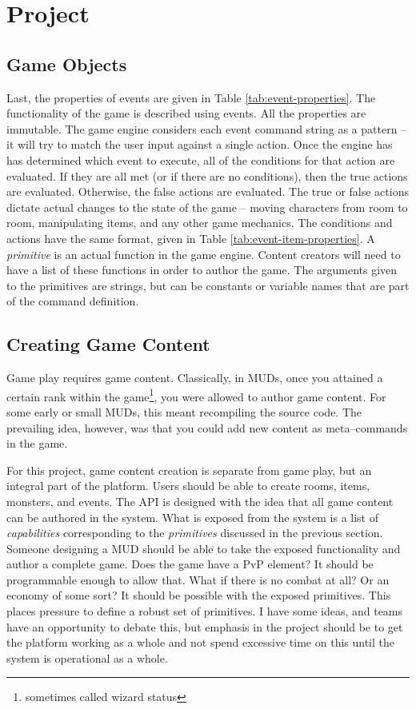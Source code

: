 \documentclass{article}
\newcommand{\enterProblemHeader}[1]{
}
\newcommand{\exitProblemHeader}[1]{
\nobreak\extramarks{#1}{}\nobreak
}
\newcounter{homeworkProblemCounter} %
\newcommand{\homeworkProblemName}{}
\newenvironment{homeworkProblem}[1][Problem \arabic{homeworkProblemCounter}]{ %
\stepcounter{homeworkProblemCounter} %
\renewcommand{\homeworkProblemName}{#1} %
\section{\homeworkProblemName} %
\enterProblemHeader{\homeworkProblemName} %
}{
\exitProblemHeader{\homeworkProblemName} %
}
\newcommand{\homeworkSectionName}{}
\newenvironment{homeworkSection}[1]{ %
\renewcommand{\homeworkSectionName}{#1} %
\subsection{\homeworkSectionName} %
\enterProblemHeader{\homeworkProblemName\ [\homeworkSectionName]} %
}{
\enterProblemHeader{\homeworkProblemName} %
}
\begin{document}
\begin{homeworkProblem}[Project]
\begin{homeworkSection}{Game Objects}
	Last, the properties of events are given in Table \ref{tab:event-properties}. The functionality of the game is described using events. All the properties are immutable. The game engine considers each event command string as a pattern -- it will try to match the user input against a single action. Once the engine has has determined which event to execute, all of the conditions for that action are evaluated. If they are all met (or if there are no conditions), then the true actions are evaluated. Otherwise, the false actions are evaluated. The true or false actions dictate actual changes to the state of the game -- moving characters from room to room, manipulating items, and any other game mechanics. The conditions and actions have the same format, given in Table \ref{tab:event-item-properties}. A \textit{primitive} is an actual function in the game engine. Content creators will need to have a list of these functions in order to author the game. The arguments given to the primitives are strings, but can be constants or variable names that are part of the command definition.
\end{homeworkSection}

\begin{homeworkSection}{Creating Game Content}
	Game play requires game content. Classically, in MUDs, once you attained a certain rank within the game\footnote{sometimes called wizard status}, you were allowed to author game content. For some early or small MUDs, this meant recompiling the source code. The prevailing idea, however, was that you could add new content as meta--commands in the game.

	For this project, game content creation is separate from game play, but an integral part of the platform. Users should be able to create rooms, items, monsters, and events. The API is designed with the idea that all game content can be authored in the system. What is exposed from the system is a list of \textit{capabilities} corresponding to the \textit{primitives} discussed in the previous section. Someone designing a MUD should be able to take the exposed functionality and author a complete game. Does the game have a PvP element? It should be programmable enough to allow that. What if there is no combat at all? Or an economy of some sort? It should be possible with the exposed primitives. This places pressure to define a robust set of primitives. I have some ideas, and teams have an opportunity to debate this, but emphasis in the project should be to get the platform working as a whole and not spend excessive time on this until the system is operational as a whole.
\end{homeworkSection}


\end{homeworkProblem}
\end{document}
